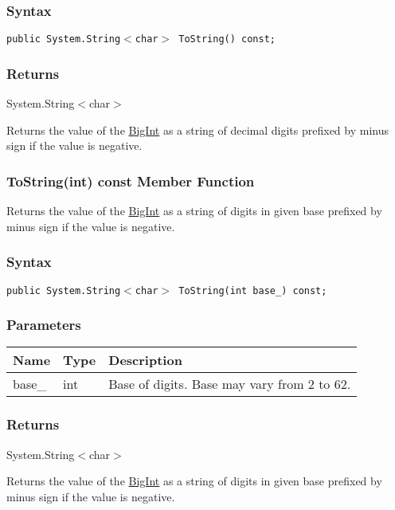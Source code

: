 \documentclass[a4paper,oneside,11.000000pt]{book}
\begin{document}
\subsubsection*{Syntax}
\texttt{public System.String$<$char$>$ ToString() const;}
\subsubsection*{Returns}System.\-String$<$\-char$>$\-
\begin{flushleft}
Returns the value of the \hyperlink{System.Numerics.Multiprecision.BigInt}{BigInt} as a string of decimal digits prefixed by minus sign if the value is negative.

\end{flushleft}
\clearpage

\hypertarget{System.Numerics.Multiprecision.BigInt.ToString.C.P.System.Numerics.Multiprecision.BigInt.int}{\subsubsection*{ToString(int) const Member Function}}
\begin{flushleft}
Returns the value of the \hyperlink{System.Numerics.Multiprecision.BigInt}{BigInt} as a string of digits in given base prefixed by minus sign if the value is negative.

\end{flushleft}
\subsubsection*{Syntax}
\texttt{public System.String$<$char$>$ ToString(int base\_) const;}
\subsubsection*{Parameters}
\begin{flushleft}
\begin{supertabular}[l]{lll}
\textbf{Name}
& \textbf{Type}
& \textbf{Description}
\\
\hline
base\_
& int
& Base of digits. Base may vary from 2 to 62.

\\
\end{supertabular}

\end{flushleft}
\subsubsection*{Returns}System.\-String$<$\-char$>$\-
\begin{flushleft}
Returns the value of the \hyperlink{System.Numerics.Multiprecision.BigInt}{BigInt} as a string of digits in given base prefixed by minus sign if the value is negative.

\end{flushleft}
\clearpage
\end{document}
